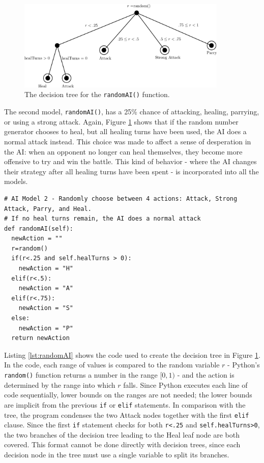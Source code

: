 \begin{figure}[H]
  \centering
  \includegraphics[width=10cm]{figures/AIRandom.png}
  \caption{The decision tree for the \texttt{randomAI()} function.}
  \label{fig:AI2}
\end{figure}
The second model, \texttt{randomAI()}, has a 25\% chance of attacking, healing, parrying, or using a strong attack. Again, Figure \ref{fig:AI2} shows that if the random number generator chooses to heal, but all healing turns have been used, the AI does a normal attack instead. This choice was made to affect a sense of desperation in the AI: when an opponent no longer can heal themselves, they become more offensive to try and win the battle. This kind of behavior - where the AI changes their strategy after all healing turns have been spent - is incorporated into all the models.\\

\begin{lstlisting}
# AI Model 2 - Randomly choose between 4 actions: Attack, Strong Attack, Parry, and Heal.
# If no heal turns remain, the AI does a normal attack
def randomAI(self):
  newAction = ""
  r=random()
  if(r<.25 and self.healTurns > 0):
    newAction = "H"
  elif(r<.5):
    newAction = "A"
  elif(r<.75):
    newAction = "S"
  else:
    newAction = "P"
  return newAction
\end{lstlisting}

Listing \ref{lst:randomAI} shows the code used to create the decision tree in Figure \ref{fig:AI2}. In the code, each range of values is compared to the random variable $r$ - Python's \texttt{random()} function returns a number in the range $[0, 1)$ - and the action is determined by the range into which $r$ falls. Since Python executes each line of code sequentially, lower bounds on the ranges are not needed; the lower bounds are implicit from the previous \texttt{if} or \texttt{elif} statements. In comparison with the tree, the program condenses the two Attack nodes together with the first \texttt{elif} clause. Since the first \texttt{if} statement checks for both \texttt{r<.25} and \texttt{self.healTurns>0}, the two branches of the decision tree leading to the Heal leaf node are both covered. This format cannot be done directly with decision trees, since each decision node in the tree must use a single variable to split its branches.

